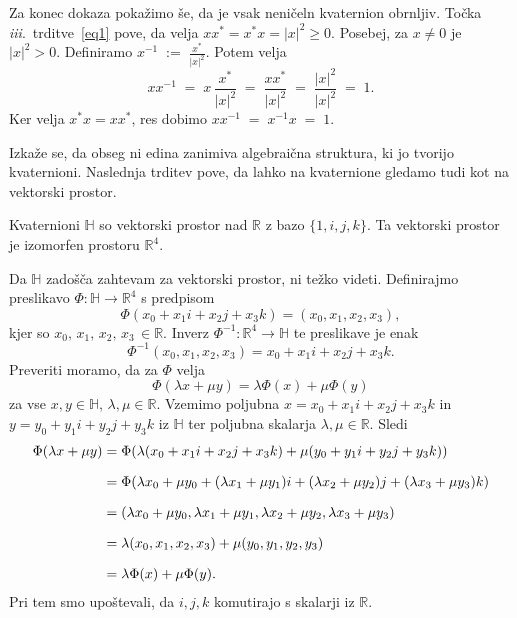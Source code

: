 \documentclass[mat1, tisk]{fmfdelo}
\numberwithin{equation}{section}
\begin{document}
\begin{dokaz}
        \medskip
        Za konec dokaza pokažimo še, da je vsak neničeln kvaternion obrnljiv. Točka \textit{iii}.\ trditve~\ref{eq1}
        pove, da velja
        $xx^{*} = x^{*}x = |x|^2  \geq 0.$
        Posebej, za $x\neq 0$ je $|x|^2 > 0$. Definiramo
        $
        x^{-1}\;:=\;\frac{x^{*}}{|x|^2}.
        $
        Potem velja
        \[
        xx^{-1} \;=\; x\,\frac{x^{*}}{|x|^2} \;=\; \frac{xx^{*}}{|x|^2} \;=\; \frac{|x|^2}{|x|^2} \;=\; 1.
        \]
        Ker velja $x^{*} x = x x^{*}$, res dobimo $xx^{-1} \;=\; x^{-1}x \;=\; 1$.
\end{dokaz}
Izkaže se, da obseg ni edina zanimiva algebraična struktura, ki jo tvorijo kvaternioni. Naslednja trditev pove, da lahko na kvaternione gledamo tudi kot na vektorski prostor.

\begin{trditev}\label{vektorski_prostor}
    Kvaternioni $\mathbb{H}$ so vektorski prostor nad $\mathbb{R}$ z bazo $\{1, i, j, k\}$. Ta vektorski prostor je izomorfen prostoru $\mathbb{R}^4$.
\end{trditev}

\begin{dokaz}
    Da $\mathbb{H}$ zadošča zahtevam za vektorski prostor, ni težko videti. Definirajmo preslikavo
    $\Phi : \mathbb{H} \rightarrow \mathbb{R}^4$ s predpisom
    $$\Phi(x_0 + x_1 i + x_2 j + x_3 k) = (x_0, x_1, x_2, x_3),$$
    kjer so $x_0, \, x_1, \, x_2, \, x_3 \, \in \mathbb{R}$. Inverz $\Phi ^{-1}: \mathbb{R}^4 \rightarrow \mathbb{H}$ te preslikave
    je enak 
    $$\Phi ^{-1} (x_0, x_1, x_2, x_3) = x_0 + x_1 i + x_2 j + x_3 k.$$
     Preveriti moramo, da za $\Phi$ velja 
    $$\Phi(\lambda x + \mu y) = \lambda \Phi(x) + \mu \Phi(y)$$
    za vse $x, y \in \mathbb{H}, \, \lambda, \mu \in \mathbb{R}$. Vzemimo poljubna $x = x_0 + x_1 i + x_2 j + x_3 k$ in $y = y_0 + y_1 i + y_2 j + y_3 k$
    iz $\mathbb{H}$ ter poljubna skalarja $\lambda, \mu \in \mathbb{R}$. Sledi
    \begin{equation*}
        \setlength{\jot}{10pt}
            \begin{aligned}
                \Phi(\lambda x + \mu y) &= \Phi(\lambda (x_0 + x_1 i + x_2 j + x_3 k) + \mu (y_0 + y_1 i + y_2 j + y_3 k)) \\
                                        &= \Phi(\lambda x_0 + \mu y_0 + (\lambda x_1 + \mu y_1) i + (\lambda x_2 + \mu y_2) j + (\lambda x_3 + \mu y_3) k) \\
                                        &= (\lambda x_0 + \mu y_0, \lambda x_1 + \mu y_1, \lambda x_2 + \mu y_2, \lambda x_3 + \mu y_3) \\
                                        &= \lambda (x_0, x_1, x_2, x_3) + \mu (y_0, y_1, y_2, y_3) \\
                                        &= \lambda \Phi(x) + \mu \Phi(y).
            \end{aligned}
    \end{equation*}
    Pri tem smo upoštevali, da $i, j, k$ komutirajo s skalarji iz $\mathbb{R}$.
\end{dokaz}
\end{document}
